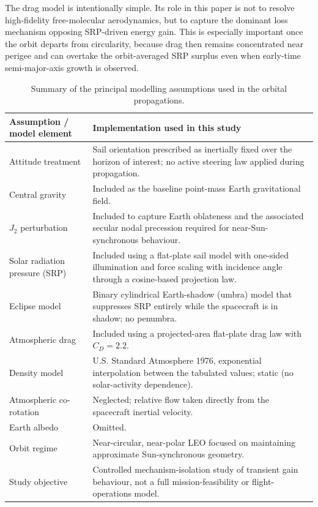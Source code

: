 \vspace{5pt}
\par\noindent The drag model is intentionally simple. Its role in this paper is not to resolve high-fidelity free-molecular aerodynamics, but to capture the dominant loss mechanism opposing SRP-driven energy gain. This is especially important once the orbit departs from circularity, because drag then remains concentrated near perigee and can overtake the orbit-averaged SRP surplus even when early-time semi-major-axis growth is observed.

\begin{table}[htbp]
\centering
\caption{Summary of the principal modelling assumptions used in the orbital propagations.}
\label{tab:model_assumptions}
\vspace{0.5em}
\small
\begin{tabular}{p{3.6cm} p{9.0cm}}
\hline
\textbf{Assumption / model element} & \textbf{Implementation used in this study} \\
\hline
Attitude treatment & Sail orientation prescribed as inertially fixed over the horizon of interest; no active steering law applied during propagation. \\

Central gravity & Included as the baseline point-mass Earth gravitational field. \\

\(J_2\) perturbation & Included to capture Earth oblateness and the associated secular nodal precession required for near-Sun-synchronous behaviour. \\

Solar radiation pressure (SRP) & Included using a flat-plate sail model with one-sided illumination and force scaling with incidence angle through a cosine-based projection law. \\

Eclipse model & Binary cylindrical Earth-shadow (umbra) model that suppresses SRP entirely while the spacecraft is in shadow; no penumbra. \\

Atmospheric drag & Included using a projected-area flat-plate drag law with \(C_D = 2.2\). \\

Density model & U.S. Standard Atmosphere 1976, exponential interpolation between the tabulated values; static (no solar-activity dependence). \\

Atmospheric co-rotation & Neglected; relative flow taken directly from the spacecraft inertial velocity. \\

Earth albedo & Omitted. \\

Orbit regime & Near-circular, near-polar LEO focused on maintaining approximate Sun-synchronous geometry. \\

Study objective & Controlled mechanism-isolation study of transient gain behaviour, not a full mission-feasibility or flight-operations model. \\
\hline
\end{tabular}
\end{table}

